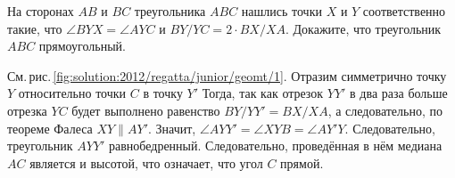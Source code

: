 \problem
На сторонах $AB$ и $BC$ треугольника $ABC$ нашлись точки $X$ и $Y$
соответственно такие, что
$\angle BYX = \angle AYC$ и $BY / YC = 2 \cdot BX / XA$.
Докажите, что треугольник $ABC$ прямоугольный.

%
\label{solution:2012/regatta/junior/geomt/1}%
См.\,рис.\,\ref{fig:solution:2012/regatta/junior/geomt/1}.
Отразим симметрично точку $Y$ относительно точки $C$ в точку $Y'$
Тогда, так как отрезок $YY'$ в два раза больше отрезка $YC$ будет выполнено
равенство $BY / YY' = BX / XA$, а следовательно, по теореме
Фалеса $XY \parallel AY'$.
Значит, $\angle AYY' = \angle XYB = \angle AY'Y$.
Следовательно, треугольник $AYY'$ равнобедренный.
Следовательно, проведённая в нём медиана $AC$ является и высотой,
что означает, что угол $C$ прямой.

\endproblem
